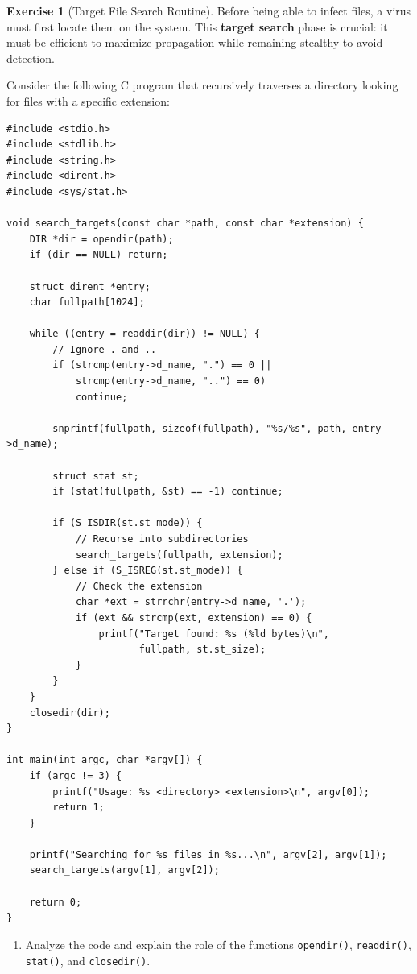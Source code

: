 \documentclass[a4paper,11pt]{article}
\theoremstyle{plain}
\theoremstyle{definition}
\newtheorem{exercice}{Exercise}
\begin{document}
\begin{exercice}[Target File Search Routine]

Before being able to infect files, a virus must first locate them on the system. This \textbf{target search} phase is crucial: it must be efficient to maximize propagation while remaining stealthy to avoid detection.

Consider the following C program that recursively traverses a directory looking for files with a specific extension:

\begin{verbatim}
#include <stdio.h>
#include <stdlib.h>
#include <string.h>
#include <dirent.h>
#include <sys/stat.h>

void search_targets(const char *path, const char *extension) {
    DIR *dir = opendir(path);
    if (dir == NULL) return;

    struct dirent *entry;
    char fullpath[1024];

    while ((entry = readdir(dir)) != NULL) {
        // Ignore . and ..
        if (strcmp(entry->d_name, ".") == 0 ||
            strcmp(entry->d_name, "..") == 0)
            continue;

        snprintf(fullpath, sizeof(fullpath), "%s/%s", path, entry->d_name);

        struct stat st;
        if (stat(fullpath, &st) == -1) continue;

        if (S_ISDIR(st.st_mode)) {
            // Recurse into subdirectories
            search_targets(fullpath, extension);
        } else if (S_ISREG(st.st_mode)) {
            // Check the extension
            char *ext = strrchr(entry->d_name, '.');
            if (ext && strcmp(ext, extension) == 0) {
                printf("Target found: %s (%ld bytes)\n",
                       fullpath, st.st_size);
            }
        }
    }
    closedir(dir);
}

int main(int argc, char *argv[]) {
    if (argc != 3) {
        printf("Usage: %s <directory> <extension>\n", argv[0]);
        return 1;
    }

    printf("Searching for %s files in %s...\n", argv[2], argv[1]);
    search_targets(argv[1], argv[2]);

    return 0;
}
\end{verbatim}

\begin{enumerate}
\item Analyze the code and explain the role of the functions \texttt{opendir()}, \texttt{readdir()}, \texttt{stat()}, and \texttt{closedir()}.


\end{enumerate}
\end{exercice}
\end{document}
